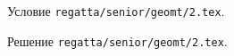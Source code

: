 \problem
Условие \texttt{regatta/senior/geomt/2.tex}.

\solution Решение \texttt{regatta/senior/geomt/2.tex}.
\endproblem
